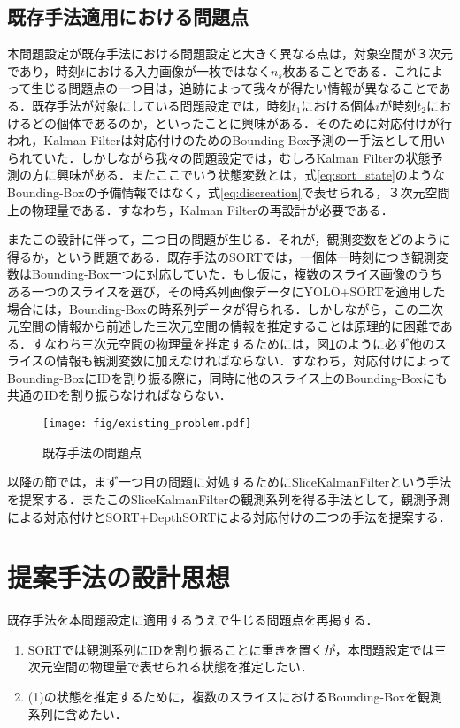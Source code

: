     \subsection{既存手法適用における問題点}
    本問題設定が既存手法における問題設定と大きく異なる点は，対象空間が３次元であり，時刻$t$における入力画像が一枚ではなく$n_s$枚あることである．これによって生じる問題点の一つ目は，追跡によって我々が得たい情報が異なることである．既存手法が対象にしている問題設定では，時刻$t_1$における個体$i$が時刻$t_2$におけるどの個体であるのか，といったことに興味がある．そのために対応付けが行われ，Kalman Filterは対応付けのためのBounding-Box予測の一手法として用いられていた．しかしながら我々の問題設定では，むしろKalman Filterの状態予測の方に興味がある．またここでいう状態変数とは，式\ref{eq:sort_state}のようなBounding-Boxの予備情報ではなく，式\ref{eq:discreation}で表せられる，３次元空間上の物理量である．すなわち，Kalman Filterの再設計が必要である．
    \par
    またこの設計に伴って，二つ目の問題が生じる．それが，観測変数をどのように得るか，という問題である．既存手法のSORTでは，一個体一時刻につき観測変数はBounding-Box一つに対応していた．もし仮に，複数のスライス画像のうちある一つのスライスを選び，その時系列画像データにYOLO+SORTを適用した場合には，Bounding-Boxの時系列データが得られる．しかしながら，この二次元空間の情報から前述した三次元空間の情報を推定することは原理的に困難である．すなわち三次元空間の物理量を推定するためには，図\ref{fig:existing_problem}のように必ず他のスライスの情報も観測変数に加えなければならない．すなわち，対応付けによってBounding-BoxにIDを割り振る際に，同時に他のスライス上のBounding-Boxにも共通のIDを割り振らなければならない．

    \begin{figure}[t]
        \centering
        \texttt{[image: fig/existing\_problem.pdf]}
        \caption{既存手法の問題点}
        \small
        \label{fig:existing_problem}
    \end{figure}

    以降の節では，まず一つ目の問題に対処するためにSliceKalmanFilterという手法を提案する．またこのSliceKalmanFilterの観測系列を得る手法として，観測予測による対応付けとSORT+DepthSORTによる対応付けの二つの手法を提案する．

\section{提案手法の設計思想}
既存手法を本問題設定に適用するうえで生じる問題点を再掲する．
\begin{enumerate}[label=(\arabic*)]
    \item SORTでは観測系列にIDを割り振ることに重きを置くが，本問題設定では三次元空間の物理量で表せられる状態を推定したい．
    \item (1)の状態を推定するために，複数のスライスにおけるBounding-Boxを観測系列に含めたい．
\end{enumerate}

